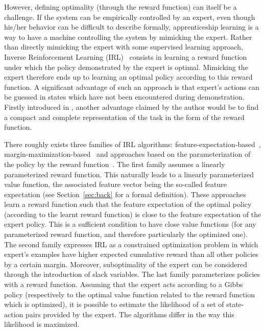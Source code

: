 \documentclass{jfpda2011}
\begin{document}
However, defining optimality (through the reward function) can
itself be a challenge. If the system can be empirically controlled
by an expert, even though his/her behavior can be difficult to
describe formally, apprenticeship learning is a way to have a
machine controlling the system by mimicking the expert. Rather than
directly mimicking the expert with some supervised learning
approach, Inverse Reinforcement Learning (IRL)~\citep{ng2000algorithms}
consists in learning a reward function under which the policy
demonstrated by the expert is optimal. Mimicking the expert therefore
ends up to learning an optimal policy according to this reward
function. A significant advantage of such an approach is that
expert's actions can be guessed in states which have not been
encountered during demonstration. Firstly introduced in \citep{russell1998learning}, another advantage claimed by the author would be to
find a compact and complete representation of the task in the form
of the reward function.

There roughly exists three families of IRL algorithms:
feature-expectation-based~\citep{abbeel2004apprenticeship,syed2008apprenticeship,syed2008game,ziebart2008maximum},
margin-maximization-based~\citep{ratliff2006maximum,ratliff2007imitation,ratliff2007boosting,kolter2008hierarchical}
and approaches based on the parameterization of the policy by the
reward function~\citep{ramachandran2007bayesian,neu2007apprenticeship}. The first family
assumes a linearly parameterized reward function. This naturally
leads to a linearly parameterized value function, the associated
feature vector being the so-called feature expectation (see Section~\ref{sec:back} for a formal definition).
These approaches learn a reward function such that the feature
expectation of the optimal policy (according to the learnt reward
function) is close to the feature expectation of the expert policy.
This is a sufficient condition to have close value functions (for any parameterized reward function, and therefore particularly the optimized one). The
second family expresses IRL as a constrained optimization problem in
which expert's examples have higher expected cumulative reward than all other
policies by a certain margin. Moreover, suboptimality of the expert
can be considered through the introduction of slack variables. The
last family parameterizes policies with a reward function. Assuming
that the expert acts according to a Gibbs policy (respectively to
the optimal value function related to the reward function which is
optimized), it is possible to estimate the likelihood of a set of
state-action pairs provided by the expert. The algorithms differ in
the way this likelihood is maximized.
\end{document}
